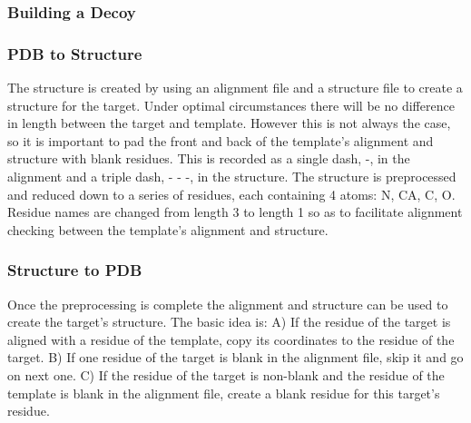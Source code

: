 \documentclass{article}
\begin{document}

\subsubsection{Building a Decoy}

\subsubsection*{PDB to Structure}

The structure is created by using an alignment file and a structure file to create a structure for the target. Under optimal circumstances there will be no difference in length between the target and template. However this is not always the case, so it is important to pad the front and back of the template's alignment and structure with blank residues. This is recorded as a single dash, -, in the alignment and a triple dash, - - -, in the structure. The structure is preprocessed and reduced down to a series of residues, each containing 4 atoms: N, CA, C, O. Residue names are changed from length 3 to length 1 so as to facilitate alignment checking between the template's alignment and structure.


\subsubsection*{Structure to PDB}

Once the preprocessing is complete the alignment and structure can be used to create the target's structure. The basic idea is:
A) If the residue of the target is aligned with a residue of the template, copy its coordinates to the residue of the target. 
B) If one residue of the target is blank in the alignment file, skip it and go on next one.
C) If the residue of the target is non-blank and the residue of the template is blank in the alignment file, create a blank residue for this target’s residue.
\end{document}
